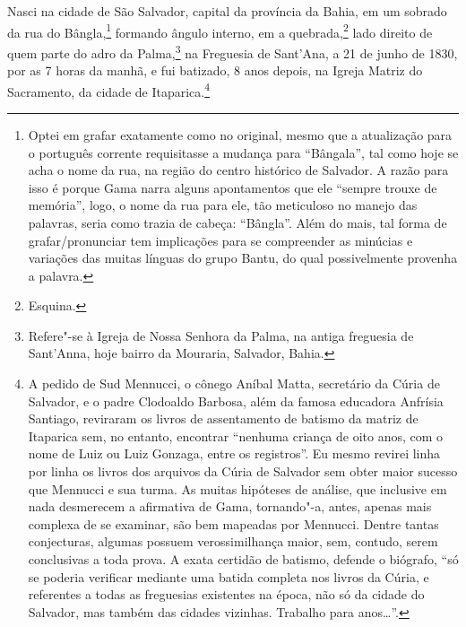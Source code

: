 Nasci na cidade de São Salvador, capital da província da Bahia, em um
sobrado da rua do Bângla,\footnote{Optei em grafar exatamente como no
  original, mesmo que a atualização para o português corrente
  requisitasse a mudança para ``Bângala'', tal como hoje se acha o nome da
  rua, na região do centro histórico de Salvador. A razão para isso é
  porque Gama narra alguns apontamentos que ele ``sempre trouxe de
  memória'', logo, o nome da rua para ele, tão meticuloso no manejo das
  palavras, seria como trazia de cabeça: ``Bângla''. Além do mais, tal
  forma de grafar/pronunciar tem implicações para se compreender as
  minúcias e variações das muitas línguas do grupo Bantu, do qual
  possivelmente provenha a palavra.} formando ângulo interno, em a
quebrada,\footnote{Esquina.} lado direito de quem parte do adro da
Palma,\footnote{Refere"-se à Igreja de Nossa Senhora da Palma, na antiga
  freguesia de Sant'Anna, hoje bairro da Mouraria, Salvador, Bahia.} na
Freguesia de Sant'Ana, a 21 de junho de 1830, por as 7 horas da manhã, e
fui batizado, 8 anos depois, na Igreja Matriz do Sacramento, da cidade
de Itaparica.\footnote{A pedido de Sud Mennucci, o cônego Aníbal Matta,
  secretário da Cúria de Salvador, e o padre Clodoaldo Barbosa, além da
  famosa educadora Anfrísia Santiago, reviraram os livros de
  assentamento de batismo da matriz de Itaparica sem, no entanto,
  encontrar ``nenhuma criança de oito anos, com o nome de Luiz ou Luiz
  Gonzaga, entre os registros''. Eu mesmo revirei linha por linha os
  livros dos arquivos da Cúria de Salvador sem obter maior sucesso que
  Mennucci e sua turma. As muitas hipóteses de análise, que inclusive em
  nada desmerecem a afirmativa de Gama, tornando"-a, antes, apenas mais
  complexa de se examinar, são bem mapeadas por Mennucci. Dentre tantas
  conjecturas, algumas possuem verossimilhança maior, sem, contudo,
  serem conclusivas a toda prova. A exata certidão de batismo, defende o
  biógrafo, ``só se poderia verificar mediante uma batida completa nos
  livros da Cúria, e referentes a todas as freguesias existentes na
  época, não só da cidade do Salvador, mas também das cidades vizinhas.
  Trabalho para anos\ldots{}''.}

